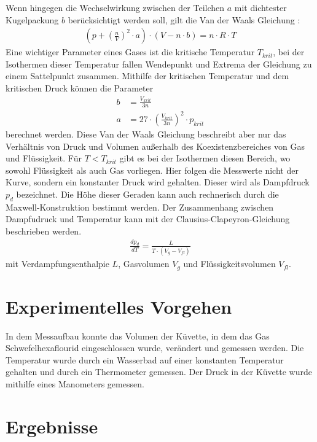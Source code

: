 \documentclass[11pt, a4paper]{article}
\begin{document}
    Wenn hingegen die Wechselwirkung zwischen der Teilchen $a$ mit dichtester Kugelpackung $b$
    berücksichtigt werden soll, gilt die Van der Waals Gleichung \cite[(4)]{ZUS}:
    \begin{align}
        \left(p+\left(\frac{n}{V}\right)^2 \cdot a\right) \cdot \left(V-n \cdot b \right) = n \cdot R \cdot T
    \end{align}
    Eine wichtiger Parameter eines Gases ist die kritische Temperatur $T_{krit}$, bei der Isothermen dieser Temperatur
    fallen Wendepunkt und Extrema der Gleichung zu einem Sattelpunkt zusammen.
    Mithilfe der kritischen Temperatur und dem kritischen Druck können die Parameter
    \begin{align}
        b &= \frac{V_{krit}}{3n} \label{eq:b}\\
        a &= 27 \cdot \left(\frac{V_{krit}}{3n}\right)^2 \cdot p_{krit} \label{eq:a}
    \end{align} 
    berechnet werden.
    Diese Van der Waals Gleichung beschreibt aber nur das Verhältnis von Druck und Volumen außerhalb des Koexistenzbereiches von Gas und Flüssigkeit.
    Für $T < T_{krit}$ gibt es bei der Isothermen diesen Bereich, wo sowohl Flüssigkeit als auch Gas vorliegen.
    Hier folgen die Messwerte nicht der Kurve, sondern ein konstanter Druck wird gehalten. Dieser wird als Dampfdruck $p_{d}$
    bezeichnet. Die Höhe dieser Geraden kann auch rechnerisch durch die Maxwell-Konstruktion bestimmt werden.
    Der Zusammenhang zwischen Dampfudruck und Temperatur kann mit der Clausius-Clapeyron-Gleichung \cite[(9)]{ZUS} beschrieben werden.
    \begin{align}
        \frac{d p_d}{d T} = \frac{L}{T \cdot\left(V_g - V_{fl}\right)} \label{eq:delta}
    \end{align}
    mit Verdampfungsenthalpie $L$, Gasvolumen $V_g$ und Flüssigkeitsvolumen $V_{fl}$.

    \section{Experimentelles Vorgehen}
    In dem Messaufbau konnte das Volumen der Küvette, in dem das Gas Schwefelhexaflourid eingeschlossen wurde, verändert und gemessen werden.
    Die Temperatur wurde durch ein Wasserbad auf einer konstanten Temperatur gehalten und durch ein Thermometer gemessen. 
    Der Druck in der Küvette wurde mithilfe eines Manometers gemessen.

    \section{Ergebnisse}
\end{document}
